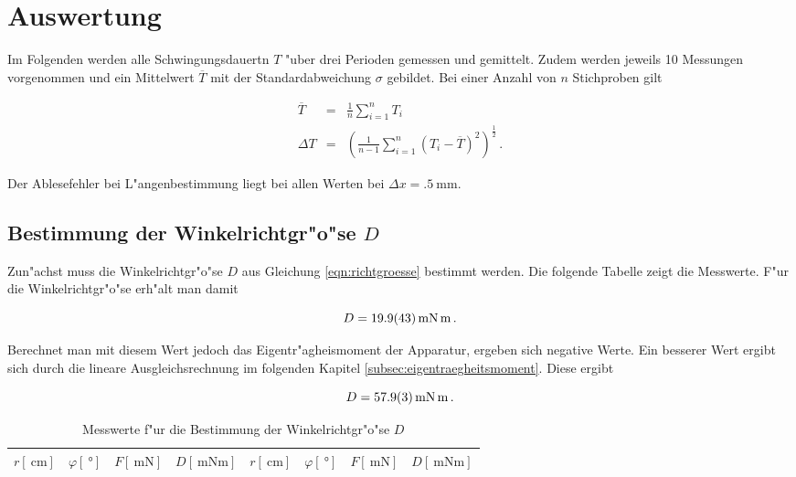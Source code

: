 \section{Auswertung}
\label{sec:auswertung}
	Im Folgenden werden alle Schwingungsdauertn $T$ "uber drei Perioden gemessen und gemittelt.
	Zudem werden jeweils 10 Messungen vorgenommen und ein Mittelwert $\overline{T}$ mit der Standardabweichung $\sigma$ gebildet.
	Bei einer Anzahl von $n$ Stichproben gilt

	\begin{eqnarray}
		\overline{T} & = & \frac{1}{n} \sum_{i = 1}^n{T_i} \nonumber \\
		\Delta T & = & \left(\frac{1}{n-1}\sum_{i = 1}^n {(T_i - \overline{T})^2}\right)^{\frac{1}{2}} \,. \nonumber
	\end{eqnarray}

	Der Ablesefehler bei L"angenbestimmung liegt bei allen Werten bei $\Delta x = \SI{.5}{\milli \meter}$.

	\subsection{Bestimmung der Winkelrichtgr"o"se $D$}
	\label{subsec:winkelrichtgroesse}
		Zun"achst muss die Winkelrichtgr"o"se $D$ aus Gleichung \eqref{eqn:richtgroesse} bestimmt werden.
		Die folgende Tabelle zeigt die Messwerte. F"ur die Winkelrichtgr"o"se erh"alt man damit

		\begin{equation*}
			D = \SI{19.9 (43)}{\milli \newton \meter} \,.
		\end{equation*}

		Berechnet man mit diesem Wert jedoch das Eigentr"agheismoment der Apparatur, ergeben sich negative Werte.
		Ein besserer Wert ergibt sich durch die lineare Ausgleichsrechnung im folgenden Kapitel \ref{subsec:eigentraegheitsmoment}.
		Diese ergibt

		\begin{equation*}
			D = \SI{57.9 (3)}{\milli \newton \meter} \,.
		\end{equation*}

		\begin{table}[h!]
			\begin{center}
				\label{tabelle:winkelrichtgroesse}
				\caption{Messwerte f"ur die Bestimmung der Winkelrichtgr"o"se $D$}
				\begin{tabular}{|c|c|c|c||c|c|c|c|}
					\hline
					$r [\SI{}{\centi \meter}]$ & $\varphi [\SI{}{\degree}]$ &  $F [\SI{}{\milli \newton}]$ & $D [\SI{}{\milli \newton \meter}]$ & $r [\SI{}{\centi \meter}]$ & $\varphi [\SI{}{\degree}]$ &  $F [\SI{}{\milli \newton}]$ & $D [\SI{}{\milli \newton \meter}]$\\
					\hline 
					\hline
					
					\hline 
				\end{tabular}
			\end{center}
		\end{table}

